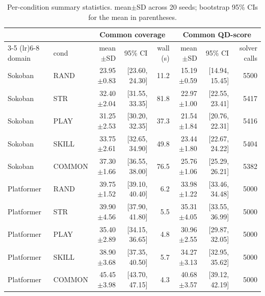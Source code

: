 \begin{table}[t]
\centering
\caption{Per-condition summary statistics. mean$\pm$SD across 20 seeds; bootstrap 95\% CIs for the mean in parentheses.}
\label{tab:summary}
\small
\begin{tabular}{l l rrr rrr}
\toprule
 & & \multicolumn{3}{c}{Common coverage} & \multicolumn{3}{c}{Common QD-score} \\
\cmidrule(lr){3-5} \cmidrule(lr){6-8}
domain & cond & mean$\pm$SD & 95\% CI & wall (s) & mean$\pm$SD & 95\% CI & solver calls \\
\midrule
Sokoban & \textsf{RAND} & 23.95$\pm$0.83 & [23.60, 24.30] & 11.2 & 15.19$\pm$0.59 & [14.94, 15.45] & 5500 \\
Sokoban & \textsf{STR} & 32.40$\pm$2.04 & [31.55, 33.35] & 81.8 & 22.97$\pm$1.00 & [22.55, 23.41] & 5417 \\
Sokoban & \textsf{PLAY} & 31.25$\pm$2.53 & [30.20, 32.35] & 37.3 & 21.54$\pm$1.84 & [20.76, 22.31] & 5416 \\
Sokoban & \textsf{SKILL} & 33.75$\pm$2.61 & [32.65, 34.90] & 49.8 & 23.44$\pm$1.80 & [22.67, 24.22] & 5404 \\
Sokoban & \textsf{COMMON} & 37.30$\pm$1.66 & [36.55, 38.00] & 76.5 & 25.76$\pm$1.06 & [25.29, 26.21] & 5382 \\
\midrule
Platformer & \textsf{RAND} & 39.75$\pm$1.52 & [39.10, 40.40] & 6.2 & 33.98$\pm$1.22 & [33.46, 34.48] & 5000 \\
Platformer & \textsf{STR} & 39.90$\pm$4.56 & [37.90, 41.80] & 5.5 & 35.31$\pm$4.05 & [33.55, 36.99] & 5000 \\
Platformer & \textsf{PLAY} & 35.40$\pm$2.89 & [34.15, 36.65] & 4.8 & 30.96$\pm$2.55 & [29.87, 32.05] & 5000 \\
Platformer & \textsf{SKILL} & 38.90$\pm$3.68 & [37.35, 40.50] & 5.7 & 34.27$\pm$3.13 & [32.95, 35.62] & 5000 \\
Platformer & \textsf{COMMON} & 45.45$\pm$3.98 & [43.70, 47.15] & 4.3 & 40.68$\pm$3.57 & [39.12, 42.19] & 5000 \\
\bottomrule
\end{tabular}
\end{table}
